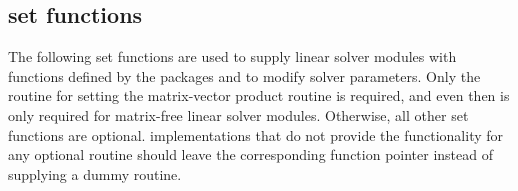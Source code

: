 \subsection{ set functions}\label{ss:sunlinsol_SetFn}

The following set functions are used to supply linear solver modules with
functions defined by the {\sundials} packages and to modify solver
parameters.  Only the routine for setting the matrix-vector product
routine is required, and even then is only required for matrix-free linear
solver modules.  Otherwise, all other set functions are optional.  {\sunlinsol}
implementations that do not provide the functionality for any optional
routine should leave the corresponding function pointer 
instead of supplying a dummy routine.

